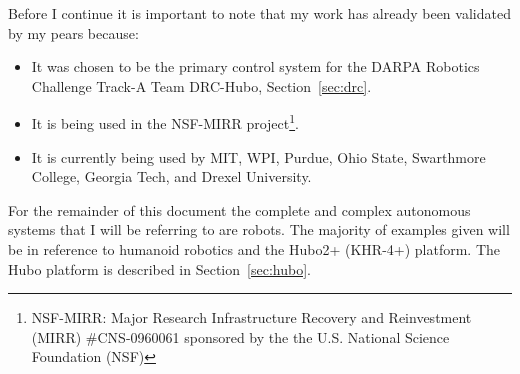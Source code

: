 Before I continue it is important to note that my work has already been validated by my pears because:
\begin{itemize}
\item It was chosen to be the primary control system for the DARPA Robotics Challenge Track-A Team DRC-Hubo, Section~\ref{sec:drc}.
\item It is being used in the NSF-MIRR project\footnote{NSF-MIRR: Major Research Infrastructure Recovery and Reinvestment (MIRR) \#CNS-0960061 sponsored by the the U.S. National Science Foundation (NSF)}.
\item It is currently being used by MIT, WPI, Purdue, Ohio State, Swarthmore College, Georgia Tech, and Drexel University.
\end{itemize}

For the remainder of this document the complete and complex autonomous systems that I will be referring to are robots.
The majority of examples given will be in reference to humanoid robotics and the Hubo2+ (KHR-4+) platform.
The Hubo platform is described in Section~\ref{sec:hubo}.


